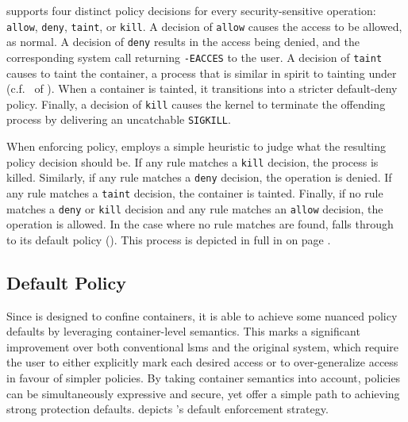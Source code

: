 \bpfcontain{} supports four distinct policy decisions for every security-sensitive
operation: \texttt{allow}, \texttt{deny}, \texttt{taint}, or \texttt{kill}. A decision of
\texttt{allow} causes the access to be allowed, as normal. A decision of \texttt{deny}
results in the access being denied, and the corresponding system call returning
\texttt{-EACCES} to the user. A decision of \texttt{taint} causes \bpfcontain{} to taint
the container, a process that is similar in spirit to tainting under \bpfbox{}
(c.f.~ of ). When a container is tainted, it
transitions into a stricter default-deny policy. Finally, a decision of \texttt{kill}
causes the kernel to terminate the offending process by delivering an uncatchable
\texttt{SIGKILL}.

When enforcing policy, \bpfcontain{} employs a simple heuristic to judge what the
resulting policy decision should be. If any rule matches a \texttt{kill} decision, the
process is killed.  Similarly, if any rule matches a \texttt{deny} decision, the operation
is denied. If any rule matches a \texttt{taint} decision, the container is tainted.
Finally, if no rule matches a \texttt{deny} or \texttt{kill} decision and any rule matches
an \texttt{allow} decision, the operation is allowed. In the case where no rule matches
are found, \bpfcontain{} falls through to its default policy
(). This process is depicted in full in
 on page \pageref{fig:bpfcontain-enforcement}.

\subsection{Default Policy}%
\label{ss:bpfcontain-default}

Since \bpfcontain{} is designed to confine containers, it is able to achieve some nuanced
policy defaults by leveraging container-level semantics. This marks a significant
improvement over both conventional \glspl{lsm} and the original \bpfbox{} system, which
require the user to either explicitly mark each desired access or to over-generalize
access in favour of simpler policies. By taking container semantics into account,
\bpfcontain{} policies can be simultaneously expressive and secure, yet offer a simple
path to achieving strong protection defaults.  depicts
\bpfcontain{}'s default enforcement strategy.

